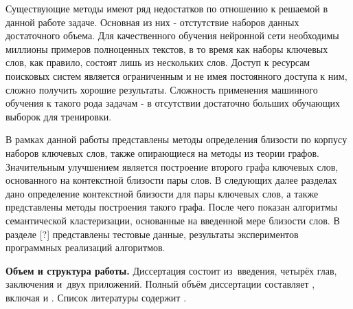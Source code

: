 Существующие методы имеют ряд недостатков по отношению к решаемой в данной работе задаче. Основная из них - отстутствие наборов данных достаточного объема. Для качественного обучения нейронной сети необходимы миллионы примеров полноценных текстов, в то время как наборы ключевых слов, как правило, состоят лишь из нескольких слов. Доступ к ресурсам поисковых систем является ограниченным и не имея постоянного доступа к ним, сложно получить хорошие результаты. Сложность применения машинного обучения к такого рода задачам - в отсутствии достаточно больших обучающих выборок для тренировки.

В рамках данной работы представлены методы определения близости по корпусу наборов ключевых слов, также опирающиеся на методы из теории графов. Значительным улучшением является построение второго графа ключевых слов, основанного на контекстной близости пары слов. В следующих далее разделах дано определение контекстной близости для пары ключевых слов, а также представлены методы построения такого графа. После чего показан алгоритмы семантической кластеризации, основанные на введенной мере близости слов. В разделе [?] представлены тестовые данные, результаты экспериментов программных реализаций алгоритмов.


\newcommand{\actuality}{}
\newcommand{\progress}{}
\newcommand{\aim}{{\textbf\aimTXT}}
\newcommand{\tasks}{\textbf{\tasksTXT}}
\newcommand{\novelty}{\textbf{\noveltyTXT}}
\newcommand{\influence}{\textbf{\influenceTXT}}
\newcommand{\methods}{\textbf{\methodsTXT}}
\newcommand{\defpositions}{\textbf{\defpositionsTXT}}
\newcommand{\reliability}{\textbf{\reliabilityTXT}}
\newcommand{\probation}{\textbf{\probationTXT}}
\newcommand{\contribution}{\textbf{\contributionTXT}}
\newcommand{\publications}{\textbf{\publicationsTXT}}



\textbf{Объем и структура работы.} Диссертация состоит из~введения, четырёх глав, заключения и~двух приложений.
%
Полный объём диссертации составляет
, включая
 и
.   Список литературы содержит  
.
